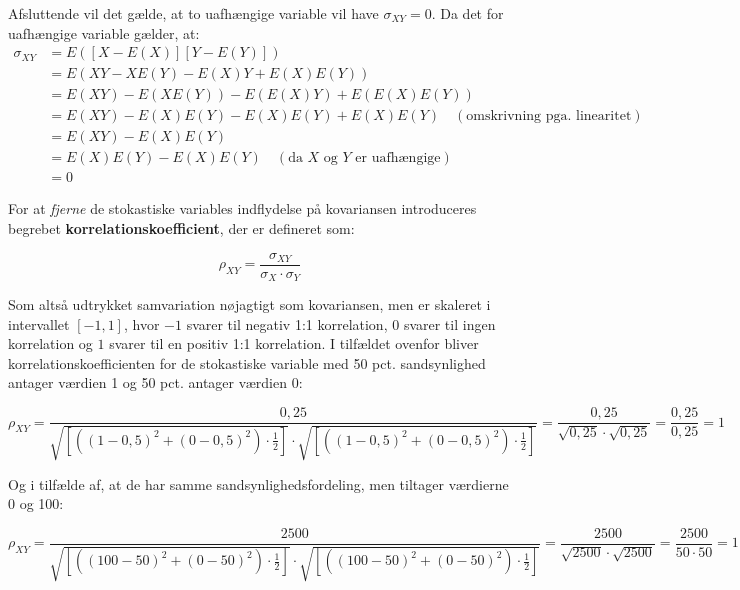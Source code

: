 \documentclass[10pt,reqno, usenames]{article}
\begin{document}
\begin{tcolorbox}[breakable, colback=red!5!white, colframe=red!50!black, title= Udledning af sammenhænge indenfor kovarians]
Afsluttende vil det gælde, at to uafhængige variable vil have $\sigma_{XY} = 0$. Da det for uafhængige variable gælder, at:
\begin{align*}
\sigma_{XY} &= E\left( [X - E(X)][Y - E(Y)] \right) \\
&= E\left( XY - XE(Y) - E(X)Y + E(X)E(Y) \right) \\
&= E(XY) - E(XE(Y)) - E(E(X)Y) + E(E(X)E(Y)) \\
&= E(XY) - E(X)E(Y) - E(X)E(Y) + E(X)E(Y) \quad (\text{omskrivning pga. linearitet}) \\
&= E(XY) - E(X)E(Y) \\
&= E(X)E(Y) - E(X)E(Y) \quad (\text{da } X \text{ og } Y \text{ er uafhængige}) \\
&= 0
\end{align*}
\end{tcolorbox}

For at \textit{fjerne} de stokastiske variables indflydelse på kovariansen introduceres begrebet \textbf{korrelationskoefficient}, der er defineret som: 

\begin{equation}
    \rho_{XY} = \frac{\sigma_{XY}}{\sigma_X \cdot \sigma_Y}
\end{equation}

Som altså udtrykket samvariation nøjagtigt som kovariansen, men er skaleret i intervallet $[-1,1]$, hvor $-1$ svarer til negativ 1:1 korrelation, $0$ svarer til ingen korrelation og $1$ svarer til en positiv 1:1 korrelation. I tilfældet ovenfor bliver korrelationskoefficienten for de stokastiske variable med 50 pct. sandsynlighed antager værdien 1 og 50 pct. antager værdien 0: 

\begin{equation*}
  \rho_{XY} = \frac{0,25}{\sqrt{[((1-0,5)^2 + (0-0,5)^2) \cdot \frac{1}{2}]} \cdot \sqrt{[((1-0,5)^2 + (0-0,5)^2) \cdot \frac{1}{2}]}} = \frac{0,25}{\sqrt{0,25} \cdot \sqrt{0,25}} = \frac{0,25}{0,25} = 1
\end{equation*}

Og i tilfælde af, at de har samme sandsynlighedsfordeling, men tiltager værdierne 0 og 100: 

\begin{equation*}
    \rho_{XY} = \frac{2500}{\sqrt{[((100-50)^2 + (0-50)^2) \cdot \frac{1}{2}]} \cdot \sqrt{[((100-50)^2 + (0-50)^2) \cdot \frac{1}{2}]}} = \frac{2500}{\sqrt{2500} \cdot \sqrt{2500}} = \frac{2500}{50 \cdot 50} = 1
\end{equation*}
\end{document}
